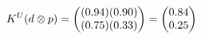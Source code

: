 \documentclass[preview]{standalone}
\begin{document}
\begin{align*}
\special{dvisvgm:raw <g id='unique000'>}K^U(d \otimes p) = \begin{pmatrix} (0.94)(0.90) \\ (0.75)(0.33) \end{pmatrix} = \begin{pmatrix} 0.84 \\ 0.25 \end{pmatrix}\special{dvisvgm:raw </g>}
\end{align*}
\end{document}
